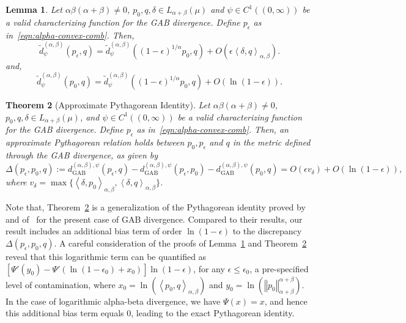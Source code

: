 \documentclass[11pt]{article}
\theoremstyle{plain}
\newtheorem{theorem}{Theorem}[section]
\newtheorem{lemma}[theorem]{Lemma}
\theoremstyle{remark}
\newcommand{\dGAB}{d_{\mathrm{GAB}}}
\newcommand{\norm}[1]{\left\Vert #1 \right\Vert}
\newcommand{\inner}[1]{\left\langle #1\right\rangle}
\begin{document}
\begin{lemma}\label{lem:dtilde-error}
    Let $\alpha\beta(\alpha+\beta)\neq 0$, $p_0, q, \delta \in L_{\alpha+\beta}(\mu)$ and $\psi \in C^1((0,\infty))$ be a valid characterizing function for the GAB divergence. Define $p_\epsilon$ as in~\eqref{eqn:alpha-convex-comb}. Then,
    \begin{equation}
        \tilde{d}_{\psi}^{(\alpha,\beta)}(p_\epsilon, q)
        = \tilde{d}_{\psi}^{(\alpha,\beta)}((1-\epsilon)^{1/\alpha} p_0, q) + O(\epsilon \inner{\delta, q}_{\alpha,\beta}).
        \label{eqn:dtilde-error}
    \end{equation}
    \noindent and,
    \begin{equation}
        \tilde{d}_{\psi}^{(\alpha,\beta)}(p_0, q) = \tilde{d}_{\psi}^{(\alpha,\beta)}((1-\epsilon)^{1/\alpha} p_0, q) + O(\ln(1-\epsilon)).
        \label{eqn:dtilde-error-2}
    \end{equation}
\end{lemma}


\begin{theorem}[Approximate Pythagorean Identity]\label{thm:pythagorean}
    Let $\alpha\beta(\alpha+\beta) \neq 0$, $p_0,q,\delta \in L_{\alpha+\beta}(\mu)$, and $\psi \in C^1((0, \infty))$ be a valid characterizing function for the GAB divergence. Define $p_\epsilon$ as in~\eqref{eqn:alpha-convex-comb}. Then, an approximate Pythagorean relation holds between $p_0, p_\epsilon$ and $q$ in the metric defined through the GAB divergence, as given by
    \begin{equation*}
        \Delta(p_\epsilon, p_0, q)
        := \dGAB^{(\alpha,\beta),\psi}(p_\epsilon, q) - \dGAB^{(\alpha,\beta),\psi}(p_\epsilon, p_0) - \dGAB^{(\alpha,\beta),\psi}(p_0, q) = O(\epsilon v_\delta) + O(\ln(1-\epsilon)),
        \label{eqn:pythagorean-error}
    \end{equation*}
    \noindent where $v_\delta = \max\{ \inner{\delta, p_0}_{\alpha,\beta}, \inner{\delta, q}_{\alpha,\beta} \}$.
\end{theorem}


Note that, Theorem~\ref{thm:pythagorean} is a generalization of the Pythagorean identity proved by~\cite[Theorem 3.2]{fujisawa2008robust} and of~\cite[Theorem 3.3]{kuchibhotla2019statistical} for the present case of GAB divergence. Compared to their results, our result includes an additional bias term of order $\ln(1-\epsilon)$ to the discrepancy $\Delta(p_\epsilon, p_0, q)$. A careful consideration of the proofs of Lemma~\ref{lem:dtilde-error} and Theorem~\ref{thm:pythagorean} reveal that this logarithmic term can be quantified as $\left[ \Psi'\left( y_0 \right) - \Psi'\left( \ln(1-\epsilon_0) + x_0 \right) \right] \ln(1-\epsilon)$, for any $\epsilon \leq \epsilon_0$, a pre-specified level of contamination, where $x_0 = \ln(\inner{p_0, q}_{\alpha,\beta})$ and $y_0 = \ln(\norm{p_0}_{\alpha+\beta}^{\alpha+\beta})$. In the case of logarithmic alpha-beta divergence, we have $\Psi(x) = x$, and hence this additional bias term equals $0$, leading to the exact Pythagorean identity.
\end{document}
